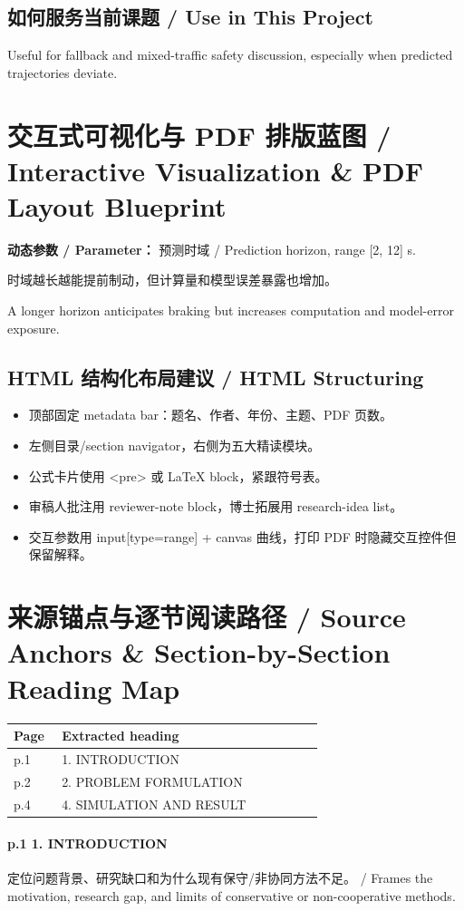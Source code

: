 \documentclass[UTF8,a4paper,11pt,fontset=fandol]{ctexart}
\begin{document}
\subsection{如何服务当前课题 / Use in This Project}
Useful for fallback and mixed-traffic safety discussion, especially when predicted trajectories deviate.

\section{交互式可视化与 PDF 排版蓝图 / Interactive Visualization \& PDF Layout Blueprint}
\textbf{动态参数 / Parameter：} 预测时域 / Prediction horizon, range [2, 12] s.

时域越长越能提前制动，但计算量和模型误差暴露也增加。

A longer horizon anticipates braking but increases computation and model-error exposure.

\subsection{HTML 结构化布局建议 / HTML Structuring}
\begin{itemize}
\item 顶部固定 metadata bar：题名、作者、年份、主题、PDF 页数。
\item 左侧目录/section navigator，右侧为五大精读模块。
\item 公式卡片使用 <pre> 或 LaTeX block，紧跟符号表。
\item 审稿人批注用 reviewer-note block，博士拓展用 research-idea list。
\item 交互参数用 input[type=range] + canvas 曲线，打印 PDF 时隐藏交互控件但保留解释。
\end{itemize}


\section{来源锚点与逐节阅读路径 / Source Anchors \& Section-by-Section Reading Map}
\begin{longtable}{p{0.14\linewidth}p{0.76\linewidth}}
\toprule
Page & Extracted heading\\
\midrule
p.1 & 1. INTRODUCTION \\
p.2 & 2. PROBLEM FORMULATION \\
p.4 & 4. SIMULATION AND RESULT \\
\bottomrule
\end{longtable}

\paragraph{p.1 1. INTRODUCTION}定位问题背景、研究缺口和为什么现有保守/非协同方法不足。 / Frames the motivation, research gap, and limits of conservative or non-cooperative methods.
\end{document}
